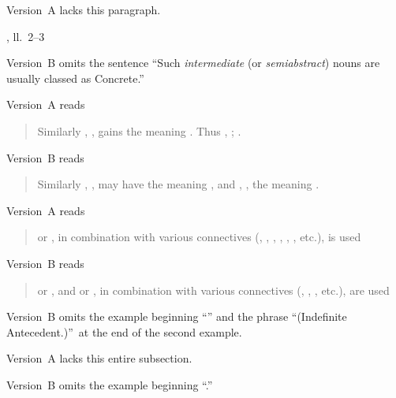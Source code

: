 \begin{variations}
Version~A lacks this paragraph.

\item[{\xref[5, \emph{d}]{240}, ll.~2–3}]

Version~B omits the sentence “Such \emph{intermediate} (or
\emph{semi\hyphenbreak abstract}) nouns are usually classed as Concrete.”

\item[{\xref[3, \emph{a}]{264}}]

Version~A reads
\begin{quote}
Similarly , , gains the
meaning .  Thus , ; .
\end{quote}
Version~B reads
\begin{quote}
Similarly , , may have the meaning
, and , , the meaning .
\end{quote}

\item[{\xref[3]{274}}]

Version~A reads
\begin{quote}
 or , in combination with various
connectives (, , , , , , etc.), is used\ellipsis
\end{quote}

Version~B reads
\begin{quote}
 or , and  or , in combination with various connectives (,
, , etc.), are used\ellipsis
\end{quote}

\item[{\xref[1]{284}}]

Version~B omits the example beginning “” and
the\linebreak
phrase “(Indefinite Antecedent.)”\ at the end of the second
example.

\item[{\xref[\emph{a}]{284}}]

Version~A lacks this entire subsection.

\item[{\xref[2]{284}}]

Version~B omits the example beginning “.”


\end{variations}
